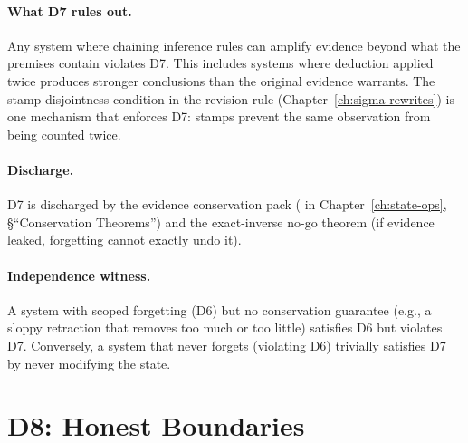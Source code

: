 \paragraph{What D7 rules out.}
Any system where chaining inference rules can amplify evidence beyond
what the premises contain violates D7.  This includes systems where
deduction applied twice produces stronger conclusions than the
original evidence warrants.  The stamp-disjointness condition in the
revision rule (Chapter~\ref{ch:sigma-rewrites}) is one mechanism that
enforces D7: stamps prevent the same observation from being counted
twice.

\paragraph{Discharge.}
D7 is discharged by the evidence conservation pack
( in
Chapter~\ref{ch:state-ops}, \S``Conservation Theorems'') and the
exact-inverse no-go theorem (if evidence leaked, forgetting cannot
exactly undo it).

\paragraph{Independence witness.}
A system with scoped forgetting (D6) but no conservation guarantee
(e.g., a sloppy retraction that removes too much or too little)
satisfies D6 but violates D7.  Conversely, a system that never forgets
(violating D6) trivially satisfies D7 by never modifying the state.



\section{D8: Honest Boundaries}
\label{sec:d8}

